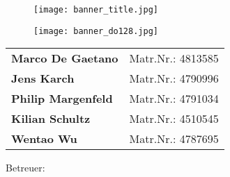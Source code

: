 \begin{titlepage}
 \centering

\begin{figure}[htbp]
 \begin{center}
  \vspace*{-4.0cm}
  \hspace*{-0.8cm}
  \texttt{[image: banner\_title.jpg]} 
 \end{center}
\end{figure}
 
\begin{figure}[htbp]
 \begin{center}
  \hspace*{-0.8cm}
  \texttt{[image: banner\_do128.jpg]}
 \end{center}
\end{figure}

 \vspace*{3.0cm}

 \textbf{\large {\Art}}


 \vspace*{1.2cm}
 
 \parbox[c]{\textwidth}{\centering \bfseries \LARGE \Titel}
 \vspace*{3cm}
 
\begin{tabular}{ll}
\textbf{\large Marco De Gaetano}  & Matr.Nr.: 4813585 \\
\textbf{\large Jens Karch}        & Matr.Nr.: 4790996 \\
\textbf{\large Philip Margenfeld} & Matr.Nr.: 4791034 \\
\textbf{\large Kilian Schultz}    & Matr.Nr.: 4510545 \\
\textbf{\large Wentao Wu}         & Matr.Nr.: 4787695
\end{tabular}

 \vspace*{2.5cm}

  \begin{center}
	Betreuer: \Pruefer
  \end{center}

\end{titlepage}

